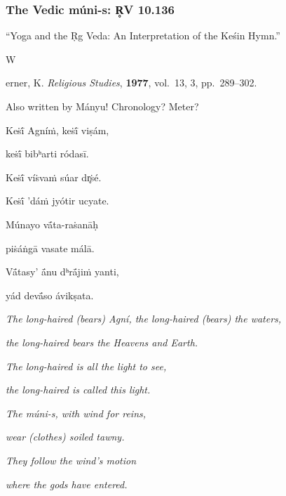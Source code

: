 \documentclass[pdf]{beamer}
\newcommand{\Subitem}[1]{{\setlength\itemindent{12pt} \item[-] #1}}
\begin{document}
\begin{frame} \frametitle{The Vedic múni-s: R̥V 10.136}
\begin{itemize}
	\item ``Yoga and the Ṛg Veda: An Interpretation of the Keśin Hymn.''
	\Subitem Werner, K. \emph{Religious Studies}, \textbf{1977}, vol.~13, 3, pp.~289--302.
	\item Also written by Mányu! Chronology? Meter?
\end{itemize}
\pause
\begin{center}
\begin{multicols}{2}
\scriptsize{
	Keṡī́ Agníṁ, keṡī́ viṣám,

	\vspace{\baselineskip}

	keṡī́ bibʰarti ródasī.

	Keṡī́ víṡvaṁ súar dr̥ṡé.

	Keṡī́ 'dáṁ jyótir ucyate.

	\vspace{12pt}

	Múnayo vā́ta-raṡanāḥ

	piṡáṅgā vasate málā.

	Vā́tasy' ā́nu dʰrā́jiṁ yanti,

	yád devā́so ávikṣata.

	\columnbreak

	\textit{The long-haired (bears) Agní, the long-haired (bears) the waters,}

	\textit{the long-haired bears the Heavens and Earth.}

	\textit{The long-haired is all the light to see,}

	\textit{the long-haired is called this light.}

	\vspace{12pt}

	\textit{The múni-s, with wind for reins,}

	\textit{wear (clothes) soiled tawny.}

	\textit{They follow the wind's motion}

	\textit{where the gods have entered.}
}
\end{multicols}
\end{center}
\end{frame}
\end{document}
